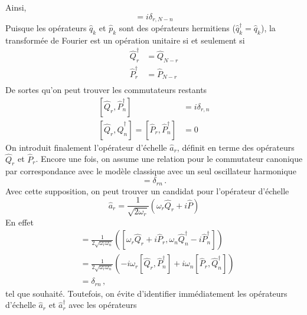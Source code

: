 \documentclass{article}
\numberwithin{equation}{section}
\theoremstyle{solution}
\begin{document}
Ainsi,
\begin{equation}
        [\hat{Q}_r, \hat{P}_n] = i\delta_{r,N-n}
\end{equation} 
Puisque les opérateurs $\hat{q}_k$ et $\hat{p}_k$ sont des opérateurs hermitiens ($\hat{q}^{\dagger}_k = \hat{q}_k$), 
la transformée de Fourier est un opération unitaire si et seulement si
\begin{equation}
\begin{split}
        \hat{Q}^{\dagger}_r &= \hat{Q}_{N-r} \\
        \hat{P}^{\dagger}_r &= \hat{P}_{N-r} \\
\end{split}
\end{equation} 
De sortes qu'on peut trouver les commutateurs restants
\begin{equation}
\begin{split}
        [\hat{Q}_r, \hat{P}^{\dagger}_n] &= i\delta_{r,n} \\
        [\hat{Q}_r, \hat{Q}^{\dagger}_n] = [\hat{P}_r, \hat{P}^{\dagger}_n] &= 0
\end{split}
\end{equation} 
On introduit finalement l'opérateur d'échelle $\hat{a}_r$, définit en terme des opérateurs $\hat{Q}_r$ et $\hat{P}_r$.
Encore une fois, on assume une relation pour le commutateur canonique par correspondance avec le modèle classique avec 
un seul oscillateur harmonique
\begin{equation}
        [\hat{a}_r, \hat{a}^{\dagger}_n] = \delta_{rn}\, .
\end{equation} 
Avec cette supposition, on peut trouver un candidat pour l'opérateur d'échelle
\begin{equation}
        \hat{a}_r = \frac{1}{\sqrt{2\omega_r}}(\omega_r \hat{Q}_r + i\hat{P})
\end{equation} 
En effet
\begin{align*}
        [\hat{a}_r, \hat{a}^{\dagger}_n] &= \frac{1}{2 \sqrt{\omega_r \omega_n}} \left([\omega_r \hat{Q}_r + i\hat{P}_r, \omega_n \hat{Q}^{\dagger}_n - i\hat{P}^{\dagger}_n] \right)  \\[2ex]
              &= \frac{1}{2 \sqrt{\omega_r \omega_n}}\left( -i\omega_r[\hat{Q}_r,\hat{P}^{\dagger}_n] 
              + i\omega_n[\hat{P}_r,\hat{Q}^{\dagger}_n]  \right)  \\[2ex]
              &= \delta_{rn}\, ,
\end{align*}
tel que souhaité.
Toutefois, on évite d'identifier immédiatement les opérateurs d'échelle $\hat{a}_r$ et $\hat{a}^{\dagger}_r$ avec les opérateurs 
\end{document}

